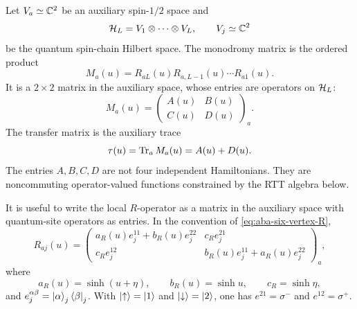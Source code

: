 Let $V_a\simeq\mathbb{C}^2$ be an auxiliary spin-$1/2$ space and
\begin{equation}
\label{eq:aba-quantum-space}
    \mathcal{H}_L=V_1\otimes\cdots\otimes V_L,
    \qquad V_j\simeq\mathbb{C}^2
\end{equation}
be the quantum spin-chain Hilbert space.  The monodromy matrix is the ordered
product
\begin{equation}
\label{eq:aba-monodromy-definition}
    M_a(u)
    =R_{aL}(u)R_{a,L-1}(u)\cdots R_{a1}(u).
\end{equation}
It is a $2\times2$ matrix in the auxiliary space, whose entries are operators on
$\mathcal{H}_L$:
\begin{equation}
\label{eq:aba-monodromy-ABCD}
    M_a(u)=
    \begin{pmatrix}
        A(u)&B(u)\\
        C(u)&D(u)
    \end{pmatrix}_a .
\end{equation}
The transfer matrix is the auxiliary trace
\begin{equation}
\label{eq:aba-transfer-matrix}
    \tau(u)=\operatorname{Tr}_a M_a(u)=A(u)+D(u).
\end{equation}
The entries $A,B,C,D$ are not four independent Hamiltonians.  They are
noncommuting operator-valued functions constrained by the RTT algebra below.

It is useful to write the local $R$-operator as a matrix in the auxiliary space
with quantum-site operators as entries.  In the convention of
\cref{eq:aba-six-vertex-R},
\begin{equation}
\label{eq:aba-local-L-operator}
    R_{aj}(u)=
    \begin{pmatrix}
        a_R(u)e^{11}_j+b_R(u)e^{22}_j
        &c_R e^{21}_j\\
        c_R e^{12}_j
        &b_R(u)e^{11}_j+a_R(u)e^{22}_j
    \end{pmatrix}_a,
\end{equation}
where
\begin{equation}
\label{eq:aba-local-weights}
    a_R(u)=\sinh(u+\eta),
    \qquad
    b_R(u)=\sinh u,
    \qquad
    c_R=\sinh\eta,
\end{equation}
and $e^{\alpha\beta}_j=\left|\alpha\right\rangle_j\left\langle \beta\right|_j$.  With
$\left|\uparrow\right\rangle=\left|1\right\rangle$ and $\left|\downarrow\right\rangle=\left|2\right\rangle$, one has
$e^{21}=\sigma^-$ and $e^{12}=\sigma^+$.

